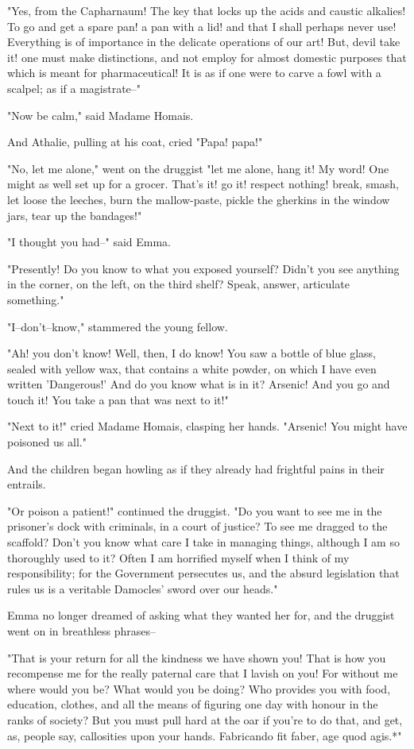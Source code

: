 \documentclass[11pt,twocolumn]{ltugboat}
\begin{document}
"Yes, from the Capharnaum! The key that locks up the acids and caustic
alkalies! To go and get a spare pan! a pan with a lid! and that I
shall perhaps never use! Everything is of importance in the delicate
operations of our art! But, devil take it! one must make distinctions,
and not employ for almost domestic purposes that which is meant for
pharmaceutical! It is as if one were to carve a fowl with a scalpel; as
if a magistrate--"

"Now be calm," said Madame Homais.

And Athalie, pulling at his coat, cried "Papa! papa!"

"No, let me alone," went on the druggist "let me alone, hang it! My
word! One might as well set up for a grocer. That's it! go it! respect
nothing! break, smash, let loose the leeches, burn the mallow-paste,
pickle the gherkins in the window jars, tear up the bandages!"

"I thought you had--" said Emma.

"Presently! Do you know to what you exposed yourself? Didn't you see
anything in the corner, on the left, on the third shelf? Speak, answer,
articulate something."

"I--don't--know," stammered the young fellow.

"Ah! you don't know! Well, then, I do know! You saw a bottle of blue
glass, sealed with yellow wax, that contains a white powder, on which I
have even written 'Dangerous!' And do you know what is in it? Arsenic!
And you go and touch it! You take a pan that was next to it!"

"Next to it!" cried Madame Homais, clasping her hands. "Arsenic! You
might have poisoned us all."

And the children began howling as if they already had frightful pains in
their entrails.

"Or poison a patient!" continued the druggist. "Do you want to see me
in the prisoner's dock with criminals, in a court of justice? To see
me dragged to the scaffold? Don't you know what care I take in managing
things, although I am so thoroughly used to it? Often I am horrified
myself when I think of my responsibility; for the Government persecutes
us, and the absurd legislation that rules us is a veritable Damocles'
sword over our heads."

Emma no longer dreamed of asking what they wanted her for, and the
druggist went on in breathless phrases--

"That is your return for all the kindness we have shown you! That is how
you recompense me for the really paternal care that I lavish on you! For
without me where would you be? What would you be doing? Who provides
you with food, education, clothes, and all the means of figuring one day
with honour in the ranks of society? But you must pull hard at the oar
if you're to do that, and get, as, people say, callosities upon your
hands. Fabricando fit faber, age quod agis.*"
\end{document}

